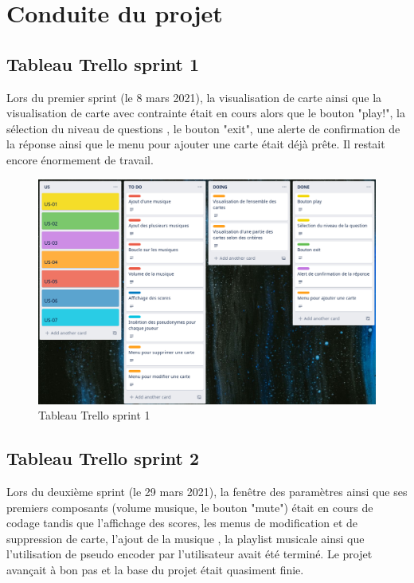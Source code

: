 \newpage
\section{Conduite du projet}
\subsection{Tableau Trello sprint 1}
Lors du premier sprint (le 8 mars 2021), la visualisation de carte ainsi que la visualisation de carte avec contrainte était en cours alors que le bouton "play!", la sélection du niveau de questions , le bouton "exit", une alerte de confirmation 
de la réponse ainsi que le menu pour ajouter une carte était déjà prête. 
Il restait encore énormement de travail.

\begin{figure}[h]
	\centering
	\includegraphics[width=\textwidth]{trello1.png}
	\caption{Tableau Trello sprint 1}
	\label{fig:Trello_sprint_1}
\end{figure}

\newpage
\subsection{Tableau Trello sprint 2}
Lors du deuxième sprint (le 29 mars 2021),  la fenêtre des paramètres ainsi que ses premiers composants (volume musique, le bouton "mute") était en cours de codage tandis que l'affichage des scores, les menus de modification et de suppression de 
carte, l'ajout de la musique , la playlist musicale ainsi que l'utilisation de pseudo encoder par l'utilisateur avait été terminé.
Le projet avançait à bon pas et la base du projet était quasiment finie. 

